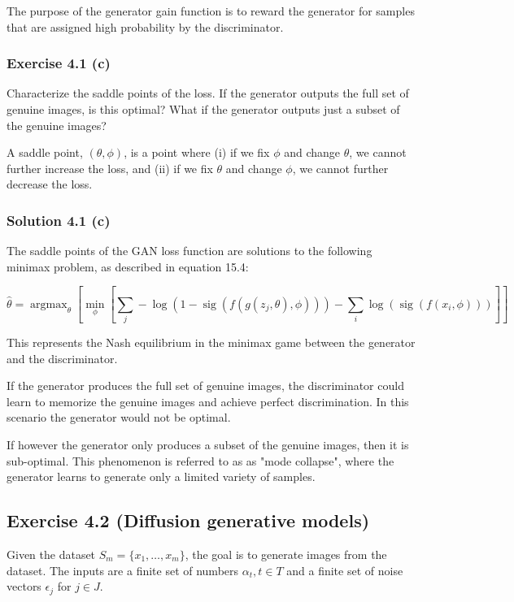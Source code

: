 \documentclass[
10pt, %
a4paper, %
oneside, %
headinclude,footinclude, %
BCOR5mm, %
]{scrartcl}
\DeclareMathOperator*{\argmax}{argmax} %
\DeclareMathOperator*{\sig}{sig}
\begin{document}
The purpose of the generator gain function is to reward the generator for samples that are assigned high probability by the discriminator.

\subsubsection*{Exercise 4.1 (c)}
Characterize the saddle points of the loss. If the generator outputs the full set of genuine images, is this optimal? What if the generator outputs just a subset of the genuine images?

A saddle point, $(\theta, \phi)$, is a point where (i) if we fix $\phi$ and change $\theta$, we cannot further increase the loss, and (ii) if we fix $\theta$ and change $\phi$, we cannot further decrease the loss.

\subsubsection*{Solution 4.1 (c)}

The saddle points of the GAN loss function are solutions to the following minimax problem, as described in \citet{prince2023understanding} equation 15.4:

\begin{equation*}
\hat{\theta} = \argmax_\theta \left[ \min_\phi \left[ \sum_j - \log(1 - \sig(f(g(z_j, \theta), \phi))) - \sum_i \log(\sig(f(x_i, \phi))) \right] \right]
\end{equation*}

This represents the Nash equilibrium in the minimax game between the generator and the discriminator.

If the generator produces the full set of genuine images, the discriminator could learn to memorize the genuine images and achieve perfect discrimination. In this scenario the generator would not be optimal.

If however the generator only produces a subset of the genuine images, then it is sub-optimal. This phenomenon is referred to as as "mode collapse", where the generator learns to generate only a limited variety of samples.

\newpage

\subsection*{Exercise 4.2 (Diffusion generative models)}
Given the dataset $S_m = \{x_1 , \ldots , x_m \}$, the goal is to generate images from the dataset. The inputs are a finite set of numbers $\alpha_t , t \in T$ and a finite set of noise vectors $\epsilon_j$ for $j \in J$.
\end{document}

